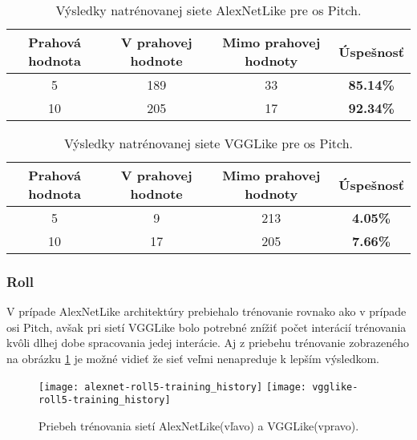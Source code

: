 \begin{table}[H]
    \centering
    \begin{tabular}{|c|c|c|c|}
        \hline
        Prahová hodnota & V prahovej hodnote       & Mimo prahovej hodnoty    & Úspešnosť    \\ \hline
        5               & {\color[HTML]{009901} 189} & {\color[HTML]{9A0000} 33} & \textbf{85.14\%} \\ \hline
        10              & {\color[HTML]{009901} 205} & {\color[HTML]{9A0000} 17} & \textbf{92.34\%} \\ \hline
    \end{tabular}
    \caption{Výsledky natrénovanej siete AlexNetLike pre os Pitch.}
    \label{tab:alexnetpitchresults}
\end{table}
\begin{table}[H]
    \centering
    \begin{tabular}{|c|c|c|c|}
        \hline
        Prahová hodnota & V prahovej hodnote       & Mimo prahovej hodnoty    & Úspešnosť    \\ \hline
        5               & {\color[HTML]{009901} 9} & {\color[HTML]{9A0000} 213} & \textbf{4.05\%} \\ \hline
        10              & {\color[HTML]{009901} 17} & {\color[HTML]{9A0000} 205} & \textbf{7.66\%} \\ \hline
    \end{tabular}
    \caption{Výsledky natrénovanej siete VGGLike pre os Pitch.}
    \label{tab:vgglikepitchresults}
\end{table}


\subsubsection{Roll}
V prípade AlexNetLike architektúry prebiehalo trénovanie rovnako ako v prípade osi Pitch,
    avšak pri sietí VGGLike bolo potrebné znížiť počet interácií trénovania kvôli dlhej dobe
    spracovania jedej interácie.
Aj z priebehu trénovanie zobrazeného na obrázku \ref{pic:rollaxis} je možné vidieť že sieť veľmi nenapreduje k lepším výsledkom.

\begin{figure}[H]
    \centering
    \texttt{[image: alexnet-roll5-training\_history]}
	\texttt{[image: vgglike-roll5-training\_history]}
	\caption{Priebeh trénovania sietí AlexNetLike(vľavo) a VGGLike(vpravo).}
	\label{pic:rollaxis}
\end{figure}

